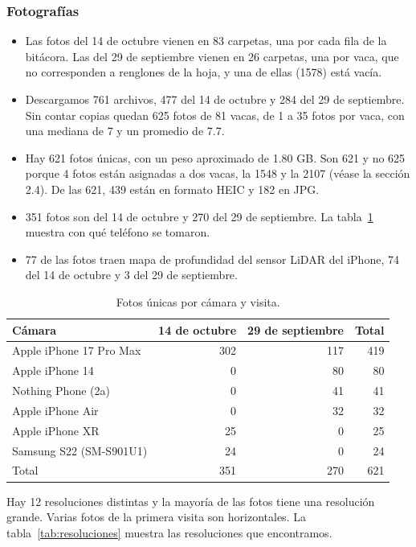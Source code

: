 \subsubsection*{Fotografías}

\begin{itemize}
  \item Las fotos del 14 de octubre vienen en 83 carpetas, una por cada fila de la bitácora. Las del 29 de septiembre vienen en 26 carpetas, una por vaca, que no corresponden a renglones de la hoja, y una de ellas (1578) está vacía.
  \item Descargamos 761 archivos, 477 del 14 de octubre y 284 del 29 de septiembre. Sin contar copias quedan 625 fotos de 81 vacas, de 1 a 35 fotos por vaca, con una mediana de 7 y un promedio de 7.7.
  \item Hay 621 fotos únicas, con un peso aproximado de 1.80 GB. Son 621 y no 625 porque 4 fotos están asignadas a dos vacas, la 1548 y la 2107 (véase la sección 2.4). De las 621, 439 están en formato HEIC y 182 en JPG.
  \item 351 fotos son del 14 de octubre y 270 del 29 de septiembre. La tabla~\ref{tab:camaras} muestra con qué teléfono se tomaron.
  \item 77 de las fotos traen mapa de profundidad del sensor LiDAR del iPhone, 74 del 14 de octubre y 3 del 29 de septiembre.
\end{itemize}

\begin{table}[H]
  \centering
  \caption{Fotos únicas por cámara y visita.}
  \label{tab:camaras}
  \begin{tabular}{lrrr}
    \toprule
    Cámara & 14 de octubre & 29 de septiembre & Total \\
    \midrule
    Apple iPhone 17 Pro Max & 302 & 117 & 419 \\
    Apple iPhone 14 & 0 & 80 & 80 \\
    Nothing Phone (2a) & 0 & 41 & 41 \\
    Apple iPhone Air & 0 & 32 & 32 \\
    Apple iPhone XR & 25 & 0 & 25 \\
    Samsung S22 (SM-S901U1) & 24 & 0 & 24 \\
    \midrule
    Total & 351 & 270 & 621 \\
    \bottomrule
  \end{tabular}
\end{table}

Hay 12 resoluciones distintas y la mayoría de las fotos tiene una resolución grande. Varias fotos de la primera visita son horizontales. La tabla~\ref{tab:resoluciones} muestra las resoluciones que encontramos.

